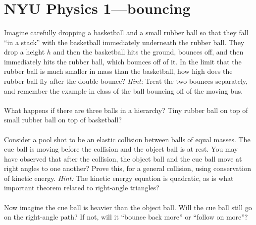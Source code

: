 \documentclass[12pt]{article}
\begin{document}
\renewcommand{\deg}{\mathrm{deg}}
\newcommand{\kg}{\mathrm{kg}}
\newcommand{\m}{\mathrm{m}}
\newcommand{\s}{\mathrm{s}}
\newcommand{\mps}{\m\,\s^{-1}}
\thispagestyle{empty}

\section*{NYU Physics 1---bouncing}

\paragraph{\theproblem}%
Imagine carefully dropping a basketball and a small rubber ball so
that they fall ``in a stack'' with the basketball immediately
underneath the rubber ball.  They drop a height $h$ and then the
basketball hits the ground, bounces off, and then immediately hits the
rubber ball, which bounces off of it.  In the limit that the rubber
ball is much smaller in mass than the basketball, how high does the
rubber ball fly after the double-bounce?  \emph{Hint:} Treat the two
bounces separately, and remember the example in class of the ball
bouncing off of the moving bus.

\paragraph{\theproblem}%
What happens if there are three balls in a hierarchy?  Tiny rubber
ball on top of small rubber ball on top of basketball?

\paragraph{\theproblem}%
Consider a pool shot to be an elastic collision between balls of equal
masses.  The cue ball is moving before the collision and the object
ball is at rest.  You may have observed that after the collision, the
object ball and the cue ball move at right angles to one another?
Prove this, for a general collision, using conservation of kinetic
energy.  \emph{Hint:} The kinetic energy equation is quadratic, as is
what important theorem related to right-angle triangles?

\paragraph{\theproblem}%
Now imagine the cue ball is heavier than the object ball.  Will the
cue ball still go on the right-angle path?  If not, will it ``bounce
back more'' or ``follow on more''?
\end{document}
